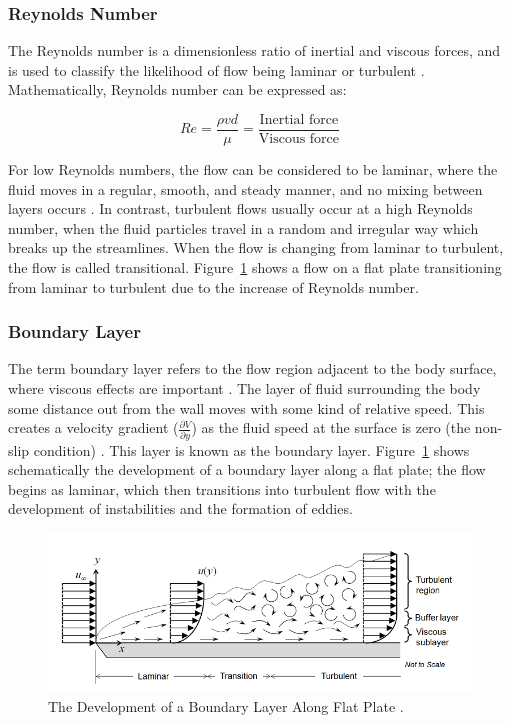 \subsubsection{Reynolds Number}
The Reynolds number is a dimensionless ratio of inertial and viscous forces, and is used to classify the likelihood of flow being laminar or turbulent \cite{Rehm2008SituationalMPD}. Mathematically, Reynolds number can be expressed as:

\begin{equation}
Re = \frac{\rho v d}{\mu} = \frac{\text{Inertial force}}{\text{Viscous force}}
\end{equation}

\noindent For low Reynolds numbers, the flow can be considered to be laminar, where the fluid moves in a regular, smooth, and steady manner, and no mixing between layers occurs \cite{Obidi2014TheoryVehicles}. In contrast, turbulent flows usually occur at a high Reynolds number, when the fluid particles travel in a random and irregular way which breaks up the streamlines. When the flow is changing from laminar to turbulent, the flow is called transitional. Figure~\ref{fig:3} shows a flow on a flat plate transitioning from laminar to turbulent  due to the increase of Reynolds number.

\subsubsection{Boundary Layer}
The term boundary layer refers to the flow region adjacent to the body surface, where viscous effects are important \cite{Anderson2010FundamentalsAerodynamics}. The layer of fluid surrounding the body some distance out from the wall moves with some kind of relative speed. This creates a velocity gradient ($\frac{\partial V}{\partial y}$) as the fluid speed at the surface is zero (the non-slip condition)  \cite{Scibor-Rylski1984RoadAerodynamics}. This layer is known as the boundary layer. Figure~\ref{fig:3} shows schematically the development of a boundary layer along a flat plate; the flow begins as laminar, which then transitions into turbulent flow with the development of instabilities and the formation of eddies.

\begin{figure}[!htb]
    \centering
    \includegraphics[scale=0.7]{Figures/BL_laminar_turbulent.png}
    \caption{The Development of a Boundary Layer Along Flat Plate \cite{Frei2017WhichApplication}.}
    \label{fig:3}
\end{figure}

